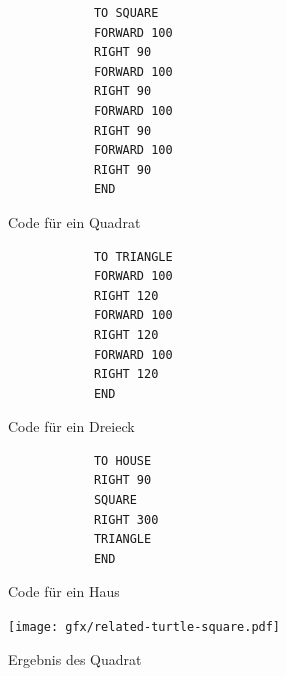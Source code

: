 \begin{figure}
    \begin{subfigure}[b]{0.3\textwidth}
        \begin{lstlisting}
            TO SQUARE
            FORWARD 100
            RIGHT 90
            FORWARD 100
            RIGHT 90
            FORWARD 100
            RIGHT 90
            FORWARD 100
            RIGHT 90
            END
            \end{lstlisting}
        \caption{Code für ein Quadrat}
        \label{fig:related:turtle:square:code}
        \vspace{0.5cm}
    \end{subfigure}\hfill
    \begin{subfigure}[b]{0.3\textwidth}
        \begin{lstlisting}
            TO TRIANGLE
            FORWARD 100
            RIGHT 120
            FORWARD 100
            RIGHT 120
            FORWARD 100
            RIGHT 120
            END
            \end{lstlisting}
        \caption{Code für ein Dreieck}
        \label{fig:related:turtle:triangle:code}
        \vspace{0.5cm}
    \end{subfigure}\hfill
    \begin{subfigure}[b]{0.3\textwidth}
        \begin{lstlisting}
            TO HOUSE
            RIGHT 90
            SQUARE
            RIGHT 300
            TRIANGLE
            END
            \end{lstlisting}
        \caption{Code für ein Haus}
        \label{fig:related:turtle:house:code}
        \vspace{0.5cm}
    \end{subfigure}
    \begin{subfigure}[b]{0.3\textwidth}
        \texttt{[image: gfx/related-turtle-square.pdf]}
        \caption{Ergebnis des Quadrat}
        \label{fig:related:turtle:square:result}
    \end{subfigure}\hfill
    \begin{subfigure}[b]{0.3\textwidth}

\end{subfigure}
\end{figure}
